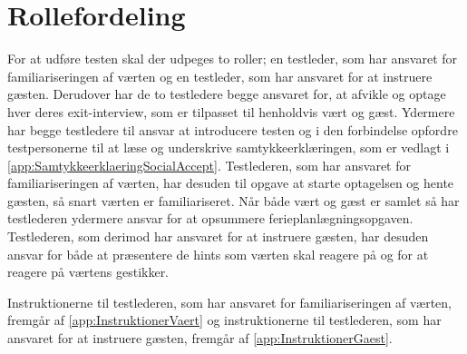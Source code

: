 \section{Rollefordeling}
\label{RollefordelingSocialAccept}
% 
For at udføre testen skal der udpeges to roller; en testleder, som har ansvaret for familiariseringen af værten og en testleder, som har ansvaret for at instruere gæsten. Derudover har de to testledere begge ansvaret for, at afvikle og optage hver deres exit-interview, som er tilpasset til henholdvis vært og gæst. Ydermere har begge testledere til ansvar at introducere testen og i den forbindelse opfordre testpersonerne til at læse og underskrive samtykkeerklæringen, som er vedlagt i \autoref{app:SamtykkeerklaeringSocialAccept}. Testlederen, som har ansvaret for familiariseringen af værten, har desuden til opgave at starte optagelsen og hente gæsten, så snart værten er familiariseret. Når både vært og gæst er samlet så har testlederen ydermere ansvar for at opsummere ferieplanlægningsopgaven. Testlederen, som derimod har ansvaret for at instruere gæsten, har desuden ansvar for både at præsentere de hints som værten skal reagere på og for at reagere på værtens gestikker.

Instruktionerne til testlederen, som har ansvaret for familiariseringen af værten, fremgår af \autoref{app:InstruktionerVaert} og instruktionerne til testlederen, som har ansvaret for at instruere gæsten, fremgår af \autoref{app:InstruktionerGaest}.    